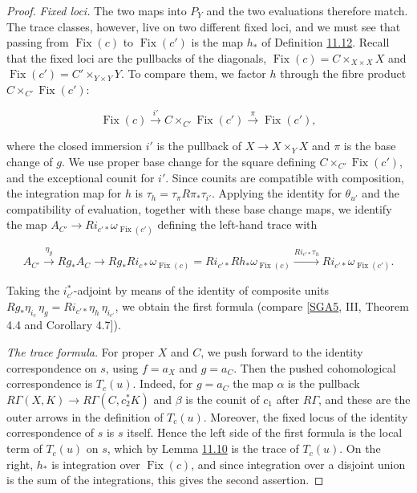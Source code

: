 \documentclass[11pt]{article}
\providecommand{\Fix}{}\renewcommand{\Fix}{\operatorname{Fix}}
\begin{document}
\begin{proof}[{Proof}]
\emph{Fixed loci.} The two maps into \(P_Y\) and the two evaluations therefore match. The trace classes, however, live on two different fixed loci, and we must see that passing from \(\Fix(c)\) to \(\Fix(c')\) is the map \(h_*\) of Definition \hyperref[bp35]{11.12}. Recall that the fixed loci are the pullbacks of the diagonals, \(\Fix(c)=C\times_{X\times X}X\) and \(\Fix(c')=C'\times_{Y\times Y}Y\). To compare them, we factor \(h\) through the fibre product \(C\times_{C'}\Fix(c')\):

\[
\Fix(c)\xrightarrow{i'}C\times_{C'}\Fix(c')\xrightarrow{\pi}\Fix(c'),
\]

where the closed immersion \(i'\) is the pullback of \(X\to X\times_YX\) and \(\pi\) is the base change of \(g\). We use proper base change for the square defining \(C\times_{C'}\Fix(c')\), and the exceptional counit for \(i'\). Since counits are compatible with composition, the integration map for \(h\) is \(\tau_h=\tau_\pi R\pi_*\tau_{i'}\). Applying the identity for \(\theta_{u'}\) and the compatibility of evaluation, together with these base change maps, we identify the map \(A_{C'}\to Ri_{c'*}\omega_{\Fix(c')}\) defining the left-hand trace with

\[
A_{C'}\xrightarrow{\eta_g}Rg_*A_C
\longrightarrow Rg_*Ri_{c*}\omega_{\Fix(c)}
=Ri_{c'*}Rh_*\omega_{\Fix(c)}
\xrightarrow{Ri_{c'*}\tau_h}Ri_{c'*}\omega_{\Fix(c')}.
\]

Taking the \(i_{c'}^*\)-adjoint by means of the identity of composite units \(Rg_*\eta_{i_c}\,\eta_g=Ri_{c'*}\eta_h\,\eta_{i_{c'}}\), we obtain the first formula (compare [\hyperref[bp57]{SGA5}, III, Theorem 4.4 and Corollary 4.7]).

\emph{The trace formula.} For proper \(X\) and \(C\), we push forward to the identity correspondence on \(s\), using \(f=a_X\) and \(g=a_C\). Then the pushed cohomological correspondence is \(T_c(u)\). Indeed, for \(g=a_C\) the map \(\alpha\) is the pullback \(R\Gamma(X,K)\to R\Gamma(C,c_2^*K)\) and \(\beta\) is the counit of \(c_1\) after \(R\Gamma\), and these are the outer arrows in the definition of \(T_c(u)\). Moreover, the fixed locus of the identity correspondence of \(s\) is \(s\) itself. Hence the left side of the first formula is the local term of \(T_c(u)\) on \(s\), which by Lemma \hyperref[bp30]{11.10} is the trace of \(T_c(u)\). On the right, \(h_*\) is integration over \(\Fix(c)\), and since integration over a disjoint union is the sum of the integrations, this gives the second assertion.
\end{proof}
\end{document}
